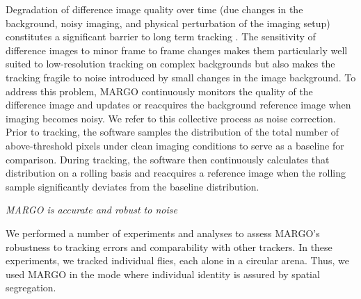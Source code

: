 \documentclass[10pt]{article}
\begin{document}
\begin{multicols}{2}
Degradation of difference image quality over time (due changes in the background, noisy imaging, and physical perturbation of the imaging setup) constitutes a significant barrier to long term tracking \cite{Sridhar_Tracktor_2018}. The sensitivity of difference images to minor frame to frame changes makes them particularly well suited to low-resolution tracking on complex backgrounds \cite{Liu_A_2018} but also makes the tracking fragile to noise introduced by small changes in the image background. To address this problem, MARGO continuously monitors the quality of the difference image and updates or reacquires the background reference image when imaging becomes noisy. We refer to this collective process as noise correction. Prior to tracking, the software samples the distribution of the total number of above-threshold pixels under clean imaging conditions to serve as a baseline for comparison.  During tracking, the software then continuously calculates that distribution on a rolling basis and reacquires a reference image when the rolling sample significantly deviates from the baseline distribution.

\textit{MARGO is accurate and robust to noise}

We performed a number of experiments and analyses to assess MARGO's robustness to tracking errors and comparability with other trackers. In these experiments, we tracked individual flies, each alone in a circular arena. Thus, we used MARGO in the mode where individual identity is assured by spatial segregation.


\end{multicols}
\end{document}
